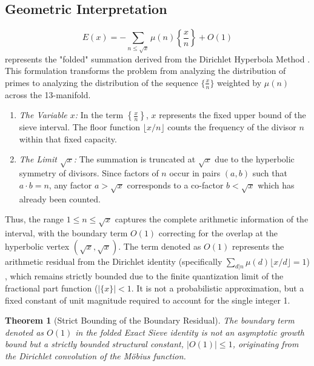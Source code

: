 \documentclass[sn-mathphys-num, pdflatex, referee]{sn-jnl}
\newtheorem{theorem}{Theorem}[section]
\begin{document}
\subsection{Geometric Interpretation}
\label{Geometric Interpretation}
\begin{equation}
E(x) = - \sum_{n \le \sqrt{x}} \mu(n) \left\{ \frac{x}{n} \right\} + O(1)
\end{equation}
represents the "folded" summation derived from the Dirichlet Hyperbola Method \cite{apostol}.
This formulation transforms the problem from analyzing the distribution of primes to analyzing the distribution of the sequence $\{\frac{x}{n}\}$ weighted by $\mu(n)$ across the 13-manifold.
\begin{enumerate}
    \item \textit{The Variable $x$:} In the term $\left\{ \frac{x}{n} \right\}$, $x$ represents the fixed upper bound of the sieve interval. The floor function $\lfloor x/n \rfloor$ counts the frequency of the divisor $n$ within that fixed capacity.
    \item \textit{The Limit $\sqrt{x}$:} The summation is truncated at $\sqrt{x}$ due to the hyperbolic symmetry of divisors. Since factors of $n$ occur in pairs $(a, b)$ such that $a \cdot b = n$, any factor $a > \sqrt{x}$ corresponds to a co-factor $b < \sqrt{x}$ which has already been counted.
\end{enumerate}
Thus, the range $1 \le n \le \sqrt{x}$ captures the complete arithmetic information of the interval, with the boundary term $O(1)$ correcting for the overlap at the hyperbolic vertex $(\sqrt{x}, \sqrt{x})$.
The term denoted as $O(1)$ represents the arithmetic residual from the Dirichlet identity (specifically $\sum_{d|n} \mu(d) \lfloor x/d \rfloor = 1$) \cite{apostol}, which remains strictly bounded due to the finite quantization limit of the fractional part function ($|\{x\}| < 1$. It is not a probabilistic approximation, but a fixed constant of unit magnitude required to account for the single integer 1.

\begin{theorem}[Strict Bounding of the Boundary Residual]
The boundary term denoted as $O(1)$ in the folded Exact Sieve identity is not an asymptotic growth bound but a strictly bounded structural constant, $|O(1)| \le 1$, originating from the Dirichlet convolution of the M\"{o}bius function.
\end{theorem}
\end{document}
